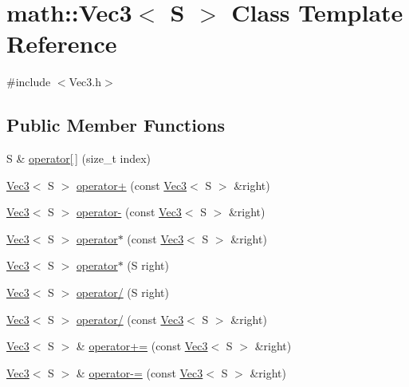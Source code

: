 \hypertarget{classmath_1_1_vec3}{}\section{math\+:\+:Vec3$<$ S $>$ Class Template Reference}
\label{classmath_1_1_vec3}


{\ttfamily \#include $<$Vec3.\+h$>$}

\subsection*{Public Member Functions}
\begin{DoxyCompactItemize}
\item 
S \& \hyperlink{classmath_1_1_vec3_a1748c205116e0af40aa83f2b6779e793}{operator\mbox{[}$\,$\mbox{]}} (size\+\_\+t index)
\item 
\hyperlink{classmath_1_1_vec3}{Vec3}$<$ S $>$ \hyperlink{classmath_1_1_vec3_a4b0af91c5c4825772e20568d3a132c2d}{operator+} (const \hyperlink{classmath_1_1_vec3}{Vec3}$<$ S $>$ \&right)
\item 
\hyperlink{classmath_1_1_vec3}{Vec3}$<$ S $>$ \hyperlink{classmath_1_1_vec3_a0a0ac5cc4b2e39cf68adc28442747651}{operator-\/} (const \hyperlink{classmath_1_1_vec3}{Vec3}$<$ S $>$ \&right)
\item 
\hyperlink{classmath_1_1_vec3}{Vec3}$<$ S $>$ \hyperlink{classmath_1_1_vec3_aeafba08a1b074a3fc550c76b85e15f1b}{operator$\ast$} (const \hyperlink{classmath_1_1_vec3}{Vec3}$<$ S $>$ \&right)
\item 
\hyperlink{classmath_1_1_vec3}{Vec3}$<$ S $>$ \hyperlink{classmath_1_1_vec3_a0b6b8e5f817bb76537452b0df7fbdd06}{operator$\ast$} (S right)
\item 
\hyperlink{classmath_1_1_vec3}{Vec3}$<$ S $>$ \hyperlink{classmath_1_1_vec3_aeac6cb88e12f56a13f086a1cecfae1c1}{operator/} (S right)
\item 
\hyperlink{classmath_1_1_vec3}{Vec3}$<$ S $>$ \hyperlink{classmath_1_1_vec3_a146b07bcbe24f5a380276adb8270b10e}{operator/} (const \hyperlink{classmath_1_1_vec3}{Vec3}$<$ S $>$ \&right)
\item 
\hyperlink{classmath_1_1_vec3}{Vec3}$<$ S $>$ \& \hyperlink{classmath_1_1_vec3_abd59720702df202ce59c5d5de5901f4b}{operator+=} (const \hyperlink{classmath_1_1_vec3}{Vec3}$<$ S $>$ \&right)
\item 
\hyperlink{classmath_1_1_vec3}{Vec3}$<$ S $>$ \& \hyperlink{classmath_1_1_vec3_a8e49dbf07da4a23576e7b76d3465279d}{operator-\/=} (const \hyperlink{classmath_1_1_vec3}{Vec3}$<$ S $>$ \&right)

\end{DoxyCompactItemize}
